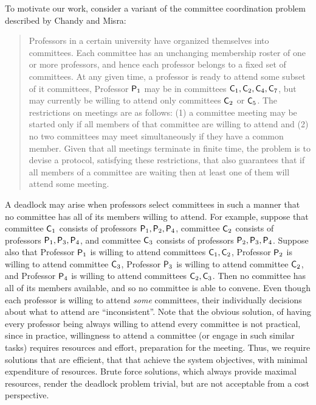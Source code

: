 To motivate our work, consider a variant of 
the committee coordination problem described by Chandy and Misra: %
\begin{quote}
  Professors in a certain university have organized themselves into committees.  Each committee has an unchanging membership roster of one or more
  professors, and hence each professor belongs to a fixed set of committees.
At any given time, a professor is ready to attend some subset of it committees, \eg Professor $\mathsf{P}_1$ may be in committees $\mathsf{C}_1, \mathsf{C}_2, \mathsf{C}_4, \mathsf{C}_7$, but may
currently be willing to attend only committees $\mathsf{C}_2$ or $\mathsf{C}_5$.
The restrictions on meetings are as follows: (1) a committee meeting may be started only if all
  members of that committee are willing to attend and (2) no two committees may meet simultaneously if they have a common member.  Given that all meetings
  terminate in finite time, the problem is to devise a protocol, satisfying these restrictions, that also guarantees that if all members of a
  committee are waiting then at least one of them will attend some meeting.
\end{quote}
A deadlock may arise when professors select committees in such a manner that no committee has all of its members willing to attend.  
%
For example, suppose that 
committee $\mathsf{C}_1$ consists of professors $\mathsf{P}_1, \mathsf{P}_2, \mathsf{P}_4$, 
committee $\mathsf{C}_2$ consists of professors $\mathsf{P}_1, \mathsf{P}_3, \mathsf{P}_4$, and 
committee $\mathsf{C}_3$ consists of professors $\mathsf{P}_2, \mathsf{P}_3, \mathsf{P}_4$.
%
Suppose also that 
Professor $\mathsf{P}_1$ is willing to attend committees $\mathsf{C}_1, \mathsf{C}_2$, 
Professor $\mathsf{P}_2$ is willing to attend committee $\mathsf{C}_3$, %
Professor $\mathsf{P}_3$ is willing to attend committee $\mathsf{C}_2$, and %
Professor $\mathsf{P}_4$ is willing to attend committees $\mathsf{C}_2, \mathsf{C}_3$. %
%
Then no committee has all of its members available, and so no committee is able to convene. 
Even though each professor is willing to attend \emph{some} committees, their individually decisions about what to attend are 
``inconsistent''. 
Note that the obvious solution, of having every professor being always willing to attend every committee is not practical, since in practice,
willingness to attend a committee (or engage in such similar tasks) requires resources and effort, \eg preparation for the meeting. 
Thus, we require solutions that are efficient, that that achieve the system objectives, with minimal expenditure of resources. 
Brute force solutions, which always provide maximal resources, render the deadlock problem trivial, but are not acceptable from a cost perspective.


